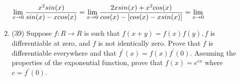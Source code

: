 \documentclass[fleqn]{article}
\begin{document}
\begin{enumerate}
      \textcolor{hwColor}{
        $
          \lim\limits_{x \to 0} \dfrac{x^2 sin(x)}{sin(x)-x cos(x)}
          \\
          \\
          =\lim\limits_{x \to 0} \dfrac{2x sin(x)+x^2 cos(x)}{cos(x)-\left[cos(x)-xsin(x)\right]}
          \\
          \\
          =\lim\limits_{x \to 0}  
        $
      }

    \item (39) Suppose $f: R \longrightarrow R$ is such that $f(x+y)=f(x)f(y), f$ is differentiable at zero, and $f$ is
    not identically zero. Prove that $f$ is differentiable everywhere and that $f^'(x)=f(x)f^'(0)$.
    Assuming the properties of the exponential function, prove that $f(x)=e^{cx}$ where $c=f^'(0)$.



  \end{enumerate}
\end{document}
